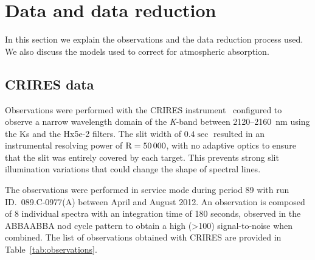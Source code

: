 \documentclass[fleqn,usenatbib]{mnras}
\begin{document}







\section{Data and data reduction}
\label{sec:data}
In this section we explain the observations and the data reduction process used. We also discuss the models used to correct for atmospheric absorption.


\subsection{CRIRES data}
\label{subsec:CRIRES} 
Observations were performed with the CRIRES instrument~\citep{kaeufl_crires_2004} configured to observe a narrow wavelength domain of the \textit{K}-band between 2120--2160~nm using the {Ks} and the {Hx5e-2} filters. The slit width of \(0.4\sec \) resulted in an instrumental resolving power of \(\rm R=50\,000\), with no adaptive optics to ensure that the slit was entirely covered by each target. This prevents strong slit illumination variations that could change the shape of spectral lines.

The observations were performed in service mode during period 89 with run ID.~089.C-0977(A) between April and August 2012. An observation is composed of 8 individual spectra with an integration time of 180 seconds, observed in the ABBAABBA nod cycle pattern to obtain a high (>100) signal-to-noise when combined. The list of observations obtained with CRIRES are provided in Table~\ref{tab:observations}.


\end{document}
